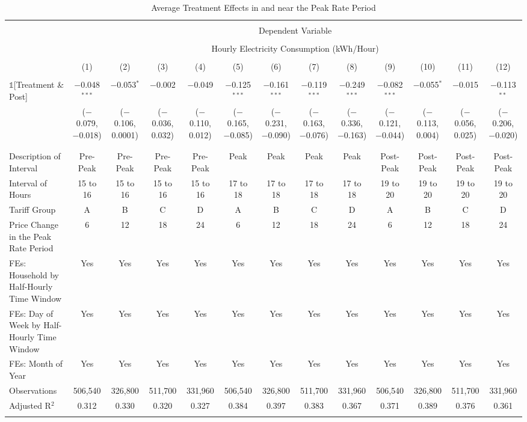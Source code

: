 
\begin{table}[!htbp] \centering 
  \caption{Average Treatment Effects in and near the Peak Rate Period} 
  \label{Table:Average-Treatment-Effects-in-and-near-the-Peak-Rate-Period} 
\small 
\begin{tabular}{@{\extracolsep{1pt}}lcccccccccccc} 
\\[-1.8ex]\hline 
\hline \\[-1.8ex] 
 & \multicolumn{12}{c}{Dependent Variable} \\ 
\cline{2-13} 
\\[-1.8ex] & \multicolumn{12}{c}{Hourly Electricity Consumption  (kWh/Hour)} \\ 
\\[-1.8ex] & (1) & (2) & (3) & (4) & (5) & (6) & (7) & (8) & (9) & (10) & (11) & (12)\\ 
\hline \\[-1.8ex] 
 $\mathbb{1}$[Treatment \& Post] & $-$0.048$^{***}$ & $-$0.053$^{*}$ & $-$0.002 & $-$0.049 & $-$0.125$^{***}$ & $-$0.161$^{***}$ & $-$0.119$^{***}$ & $-$0.249$^{***}$ & $-$0.082$^{***}$ & $-$0.055$^{*}$ & $-$0.015 & $-$0.113$^{**}$ \\ 
  & ($-$0.079, $-$0.018) & ($-$0.106, 0.0001) & ($-$0.036, 0.032) & ($-$0.110, 0.012) & ($-$0.165, $-$0.085) & ($-$0.231, $-$0.090) & ($-$0.163, $-$0.076) & ($-$0.336, $-$0.163) & ($-$0.121, $-$0.044) & ($-$0.113, 0.004) & ($-$0.056, 0.025) & ($-$0.206, $-$0.020) \\ 
  & & & & & & & & & & & & \\ 
\hline \\[-1.8ex] 
Description of Interval & Pre-Peak & Pre-Peak & Pre-Peak & Pre-Peak & Peak & Peak & Peak & Peak & Post-Peak & Post-Peak & Post-Peak & Post-Peak \\ 
Interval of Hours & 15 to 16 & 15 to 16 & 15 to 16 & 15 to 16 & 17 to 18 & 17 to 18 & 17 to 18 & 17 to 18 & 19 to 20 & 19 to 20 & 19 to 20 & 19 to 20 \\ 
Tariff Group & A & B & C & D & A & B & C & D & A & B & C & D \\ 
Price Change in the Peak Rate Period & 6 & 12 & 18 & 24 & 6 & 12 & 18 & 24 & 6 & 12 & 18 & 24 \\ 
FEs: Household by Half-Hourly Time Window & Yes & Yes & Yes & Yes & Yes & Yes & Yes & Yes & Yes & Yes & Yes & Yes \\ 
FEs: Day of Week by Half-Hourly Time Window & Yes & Yes & Yes & Yes & Yes & Yes & Yes & Yes & Yes & Yes & Yes & Yes \\ 
FEs: Month of Year & Yes & Yes & Yes & Yes & Yes & Yes & Yes & Yes & Yes & Yes & Yes & Yes \\ 
Observations & 506,540 & 326,800 & 511,700 & 331,960 & 506,540 & 326,800 & 511,700 & 331,960 & 506,540 & 326,800 & 511,700 & 331,960 \\ 
Adjusted R$^{2}$ & 0.312 & 0.330 & 0.320 & 0.327 & 0.384 & 0.397 & 0.383 & 0.367 & 0.371 & 0.389 & 0.376 & 0.361 \\ 
\hline 
\hline \\[-1.8ex] 
\end{tabular} 
\end{table} 
